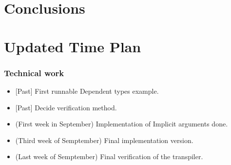\documentclass[parskip=half]{scrartcl}
\begin{document}






\section{Conclusions}


\newpage
\section{Updated Time Plan}

\subsubsection*{Technical work}
\begin{itemize}

  \item \textit{\color{gray}}[Past] First runnable Dependent types example.
  \item \textit{\color{gray}}[Past] Decide verification method.
  \item (First week in September) Implementation of Implicit arguments done.
  \item (Third week of Semptember) Final implementation version.
  \item (Last week of Semptember) Final verification of the transpiler.
\end{itemize}
\end{document}
